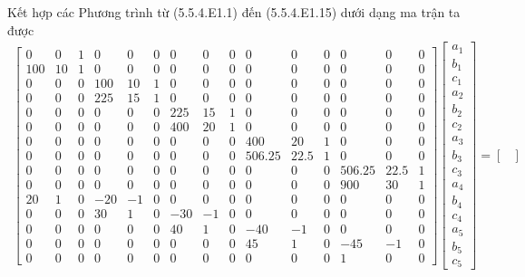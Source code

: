 Kết hợp các Phương trình từ (5.5.4.E1.1) đến (5.5.4.E1.15) dưới dạng ma trận ta được
\begin{align*}
\left[
\begin{array}{*{15}{c}}
0 & 0 & 1 & 0 & 0 & 0 & 0 & 0 & 0 & 0 & 0 & 0 & 0 & 0 & 0 \\
100 & 10 & 1 & 0 & 0 & 0 & 0 & 0 & 0 & 0 & 0 & 0 & 0 & 0 & 0 \\
0 & 0 & 0 & 100 & 10 & 1 & 0 & 0 & 0 & 0 & 0 & 0 & 0 & 0 & 0 \\
0 & 0 & 0 & 225 & 15 & 1 & 0 & 0 & 0 & 0 & 0 & 0 & 0 & 0 & 0 \\
0 & 0 & 0 & 0 & 0 & 0 & 225 & 15 & 1 & 0 & 0 & 0 & 0 & 0 & 0 \\
0 & 0 & 0 & 0 & 0 & 0 & 400 & 20 & 1 & 0 & 0 & 0 & 0 & 0 & 0 \\
0 & 0 & 0 & 0 & 0 & 0 & 0 & 0 & 0 & 400 & 20 & 1 & 0 & 0 & 0 \\
0 & 0 & 0 & 0 & 0 & 0 & 0 & 0 & 0 & 506.25 & 22.5 & 1 & 0 & 0 & 0 \\
0 & 0 & 0 & 0 & 0 & 0 & 0 & 0 & 0 & 0 & 0 & 0 & 506.25 & 22.5 & 1 \\
0 & 0 & 0 & 0 & 0 & 0 & 0 & 0 & 0 & 0 & 0 & 0 & 900 & 30 & 1 \\
20 & 1 & 0 & -20 & -1 & 0 & 0 & 0 & 0 & 0 & 0 & 0 & 0 & 0 & 0 \\
0 & 0 & 0 & 30 & 1 & 0 & -30 & -1 & 0 & 0 & 0 & 0 & 0 & 0 & 0 \\
0 & 0 & 0 & 0 & 0 & 0 & 40 & 1 & 0 & -40 & -1 & 0 & 0 & 0 & 0 \\
0 & 0 & 0 & 0 & 0 & 0 & 0 & 0 & 0 & 45 & 1 & 0 & -45 & -1 & 0 \\
0 & 0 & 0 & 0 & 0 & 0 & 0 & 0 & 0 & 0 & 0 & 0 & 1 & 0 & 0 
\end{array}
\right]
\begin{bmatrix}
a_1 \\ b_1 \\ c_1 \\ a_2 \\ b_2 \\ c_2 \\ a_3 \\ b_3 \\ c_3 \\ a_4 \\ b_4 \\ c_4 \\ a_5 \\ b_5 \\ c_5
\end{bmatrix}
=
\begin{bmatrix}

\end{bmatrix}
\end{align*}
